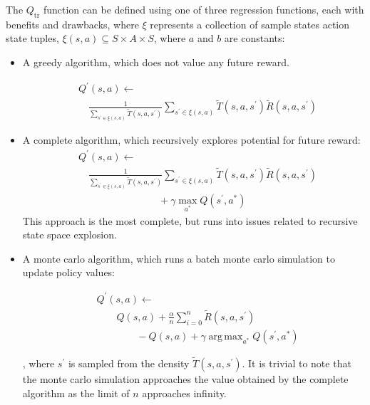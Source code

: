 \documentclass[compsoc,journal,letterpaper,10pt,draftcls,twocolumn]{IEEEtran}
\DeclareMathOperator*{\argmax}{arg\,max}
\begin{document}
The \(Q_{\text{tr}}\) function can be defined using one of three
regression functions, each with benefits and drawbacks, where \(\xi\)
represents a collection of sample states action state tuples,
\(\xi\left( s,a \right) \subseteq S \times A \times S\), where \(a\) and
\(b\) are constants:

\begin{itemize}
\item
  A greedy algorithm, which does not value any future reward.
 

\begin{align}
& Q^{\prime}(s,a) \leftarrow \nonumber \\ 
& \quad
\frac{1}{\displaystyle \sum_{s^\prime  \in\xi(s,a)} \tilde{T}\left( s,a,s^\prime \right)}\sum_{s^\prime\in\xi(s,a)}\tilde{T}\left( s,a,s^\prime \right)\tilde{R}\left( s,a,s^\prime \right)
\end{align} 

 
\item
  A complete algorithm, which recursively explores potential for future
  reward:
\begin{align}
& Q^{\prime}(s,a) \leftarrow \nonumber \\ 
& \quad \frac{1}{\displaystyle \sum_{s^\prime \in \xi(s,a)} \tilde{T}\left( s,a,s^\prime \right)}\sum_{s^\prime\in\xi(s,a)}\tilde{T}\left( s,a,s^\prime \right)\tilde{R}\left( s,a,s^\prime \right) \nonumber \\ & \qquad \qquad \qquad \qquad + \gamma\max_{a^{*}}Q(s^{\prime},a^{*}) 
\end{align}
This approach is the most complete, but runs into issues related to
recursive state space explosion.
 
\item
  A monte carlo algorithm, which runs a batch monte carlo simulation to
  update policy values:
 
\begin{align}
& Q^{\prime}\left( s,a \right) \leftarrow \nonumber \\ 
& \qquad Q\left( s,a \right) + \frac{\alpha}{n}\sum_{i = 0}^{n}\tilde{R}\left( s,a,s^\prime \right)  \\ 
& \qquad \qquad - Q \left( s,a \right) + \gamma\argmax_{a^{\ast}} Q(s^{\prime},a^{\ast}) \nonumber
\end{align}
 
, where \(s^\prime\) is sampled from the density
\(\tilde{T}\left( s,a,s^\prime \right)\). It is trivial to note that the monte
carlo simulation approaches the value obtained by the complete algorithm
as the limit of \(n\) approaches infinity.
\end{itemize}
\end{document}
